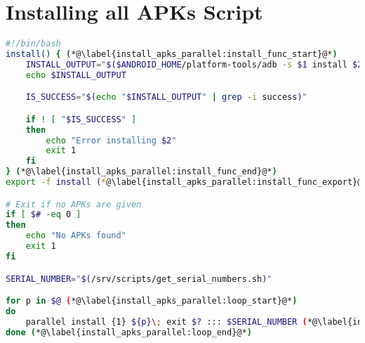 \chapter{Installing all APKs Script}\label{app:install_apks}
\begin{lstlisting}[language=bash,caption=Script that install APKs on all connected devices in parallel,label=lst:install_apks_parallel]
#!/bin/bash
install() { (*@\label{install_apks_parallel:install_func_start}@*)
    INSTALL_OUTPUT="$($ANDROID_HOME/platform-tools/adb -s $1 install $2)"
    echo $INSTALL_OUTPUT

    IS_SUCCESS="$(echo "$INSTALL_OUTPUT" | grep -i success)"

    if ! [ "$IS_SUCCESS" ]
    then
        echo "Error installing $2"
        exit 1
    fi
} (*@\label{install_apks_parallel:install_func_end}@*)
export -f install (*@\label{install_apks_parallel:install_func_export}@*)

# Exit if no APKs are given
if [ $# -eq 0 ]
then
    echo "No APKs found"
    exit 1
fi

SERIAL_NUMBER="$(/srv/scripts/get_serial_numbers.sh)"

for p in $@ (*@\label{install_apks_parallel:loop_start}@*)
do
    parallel install {1} ${p}\; exit $? ::: $SERIAL_NUMBER (*@\label{install_apks_parallel:parallel_loop}@*)
done (*@\label{install_apks_parallel:loop_end}@*)
\end{lstlisting}